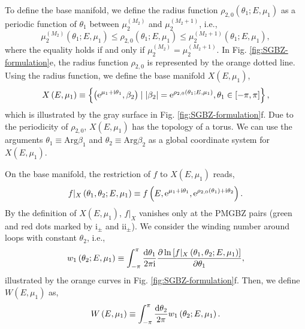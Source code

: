 To define the base manifold, we define
the radius function $\rho_{2,0}(\theta_{1};E,\mu_{1})$ as a periodic
function of $\theta_{1}$ between $\mu_{2}^{(M_{2})}$ and $\mu_{2}^{(M_{2}+1)}$,
i.e., 
\begin{equation}
\mu_{2}^{(M_{2})}\left(\theta_{1};E,\mu_{1}\right)\leq \rho_{2,0}\left(\theta_{1};E,\mu_{1}\right)\leq\mu_{2}^{(M_{2}+1)}\left(\theta_{1};E,\mu_{1}\right),\label{eq:radius-function}
\end{equation}
where the equality holds if and only if $\mu_{2}^{(M_{2})}=\mu_{2}^{(M_{2}+1)}$.
In Fig. \ref{fig:SGBZ-formulation}e, the radius function  $\rho_{2,0}$ 
is represented by the orange dotted line. Using the radius function, we define the base manifold $X(E,\mu_{1})$, 
\begin{equation}
X\left(E,\mu_{1}\right)\equiv\left\{ \left(\mathrm{e}^{\mu_{1}+\mathrm{i}\theta_{1}},\beta_{2}\right)\mid\left|\beta_{2}\right|=\mathrm{e}^{\rho_{2,0}\left(\theta_{1};E,\mu_{1}\right)},\theta_{1}\in\left[-\pi,\pi\right]\right\} ,\label{eq:base-manifold}
\end{equation}
which is illustrated by the gray surface in Fig. \ref{fig:SGBZ-formulation}f.
Due to the periodicity of $\rho_{2,0}$, $X(E,\mu_{1})$ has the topology
of a torus. We can use the arguments $\theta_{1}\equiv\text{Arg}\beta_{1}$
and $\theta_{2}\equiv\text{Arg}\beta_{2}$ as a global coordinate
system for $X(E,\mu_{1})$.

On the base manifold, the restriction of $f$ to $X(E,\mu_{1})$ reads,
\begin{equation}
f|_{X}\left(\theta_{1},\theta_{2};E,\mu_{1}\right)\equiv f\left(E,\mathrm{e}^{\mu_{1}+\mathrm{i}\theta_{1}},\mathrm{e}^{\rho_{2,0}(\theta_{1})+\mathrm{i}\theta_{2}}\right).
\end{equation}
By the definition of $X(E,\mu_{1})$, $f|_{X}$ vanishes only at the
PMGBZ pairs (green and red dots marked by $\text{i}_{\pm}$ and $\text{ii}_{\pm}$).
We consider the winding number around loops with constant $\theta_{2}$,
i.e., 
\begin{equation}
w_{1}\left(\theta_{2};E,\mu_{1}\right)\equiv\int_{-\pi}^{\pi}\frac{\mathrm{d}\theta_{1}}{2\pi\mathrm{i}}\frac{\partial\ln\left[f|_{X}\left(\theta_{1},\theta_{2};E,\mu_{1}\right)\right]}{\partial\theta_{1}},
\end{equation}
illustrated by the orange curves in Fig. \ref{fig:SGBZ-formulation}f.
Then, we define $W(E,\mu_1)$ as, 
\begin{equation}
W\left(E,\mu_{1}\right)\equiv\int_{-\pi}^{\pi}\frac{\mathrm{d}\theta_{2}}{2\pi}w_{1}\left(\theta_{2};E,\mu_{1}\right).\label{eq:def-strip-winding}
\end{equation}


